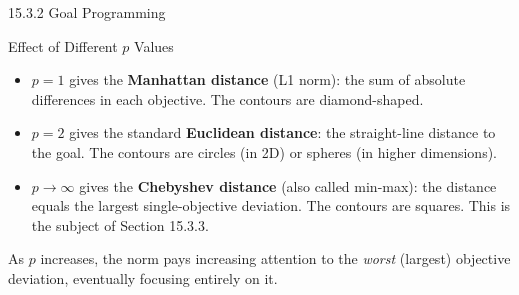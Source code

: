 \documentclass[aspectratio=169,10pt]{beamer}
\begin{document}
\begin{frame}[allowframebreaks]{15.3.2 Goal Programming}
\begin{block}{Effect of Different $p$ Values}
  \begin{itemize}
    \item $p = 1$ gives the \textbf{Manhattan distance} (L1 norm): the sum of
      absolute differences in each objective.  The contours are diamond-shaped.

    \item $p = 2$ gives the standard \textbf{Euclidean distance}: the
      straight-line distance to the goal.  The contours are circles (in 2D) or
      spheres (in higher dimensions).

    \item $p \to \infty$ gives the \textbf{Chebyshev distance} (also called
      min-max): the distance equals the largest single-objective deviation.
      The contours are squares.  This is the subject of Section 15.3.3.
  \end{itemize}
  As $p$ increases, the norm pays increasing attention to the \emph{worst}
  (largest) objective deviation, eventually focusing entirely on it.
\end{block}

\end{frame}
\end{document}
